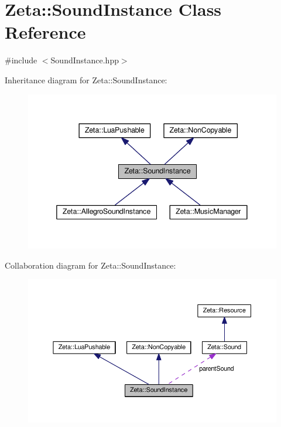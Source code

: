 \hypertarget{classZeta_1_1SoundInstance}{\section{Zeta\+:\+:Sound\+Instance Class Reference}
\label{classZeta_1_1SoundInstance}
}


{\ttfamily \#include $<$Sound\+Instance.\+hpp$>$}



Inheritance diagram for Zeta\+:\+:Sound\+Instance\+:\nopagebreak
\begin{figure}[H]
\begin{center}
\leavevmode
\includegraphics[width=341pt]{classZeta_1_1SoundInstance__inherit__graph}
\end{center}
\end{figure}


Collaboration diagram for Zeta\+:\+:Sound\+Instance\+:\nopagebreak
\begin{figure}[H]
\begin{center}
\leavevmode
\includegraphics[width=350pt]{classZeta_1_1SoundInstance__coll__graph}
\end{center}
\end{figure}
